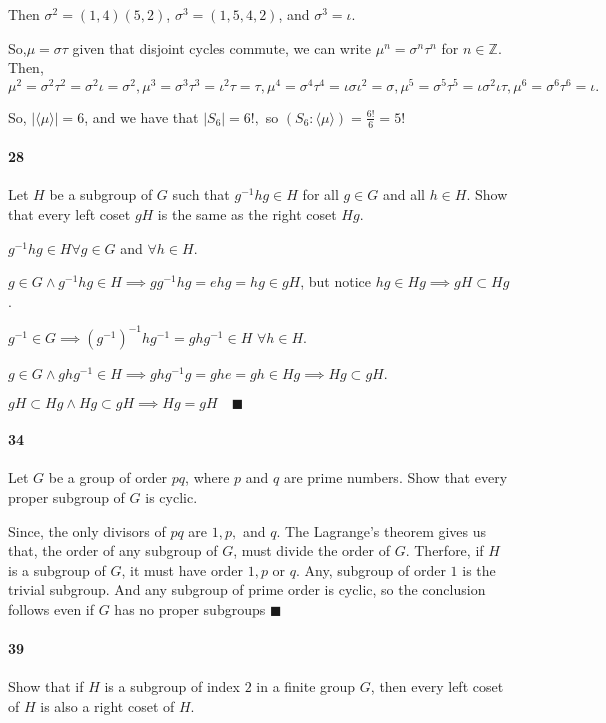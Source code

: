 \documentclass{article}
\newcommand\Z{\mathbb{Z}}
\begin{document}
Then $\sigma^2 = (1,4)(5,2)$, $\sigma^3 = (1,5,4,2)$, and $\sigma^3=\iota.$

So,$\mu = \sigma\tau$ given that disjoint cycles commute, we can write
$\mu^n = \sigma^n\tau^n$ for $n\in \Z$. Then, $$\mu^2 = \sigma^2\tau^2 = \sigma^2\iota =
\sigma^2, \mu^3 = \sigma^3\tau^3 = \iota^2\tau = \tau, \mu^4 =
\sigma^4\tau^4 = \iota\sigma\iota^2 = \sigma, \mu^5 = \sigma^5\tau^5
= \iota\sigma^2\iota\tau, \mu^6 = \sigma^6\tau^6 = \iota.$$

So, $|\langle  \mu\rangle| = 6$, and we have that $|S_6| = 6!,$ so
$(S_6:\langle \mu \rangle) = \frac{6!}{6} = 5!$


\paragraph{28} Let $H$ be a subgroup of $G$ such that $g^{-1}hg\in H$
for all $g \in G$ and  all $h\in H$. Show that every left coset $gH$
is the same as the right coset $Hg$.


$g^{-1}hg \in H \forall g\in G$ and $\forall h \in H$.

$g \in G \land g^{-1}hg\in H \implies gg^{-1}hg = ehg = hg \in gH$,
but notice $hg \in Hg \implies gH \subset Hg$.

$g^{-1}\in G \implies (g^{-1})^{-1}hg^{-1} = ghg^{-1}\in H$ $\forall h\in H$.

$g\in G \land ghg^{-1} \in H \implies ghg^{-1}g = ghe = gh\in Hg
\implies Hg \subset gH$.

$gH \subset Hg \land Hg \subset gH \implies Hg = gH \quad \blacksquare$

\paragraph{34} Let $G$ be a group of order $pq$, where $p$ and $q$ are
prime numbers. Show that every proper subgroup of $G$ is cyclic.


Since, the only divisors of $pq$ are $1,p,$ and $q$. The Lagrange's theorem
gives us that, the order of any subgroup of $G$, must divide the order
of $G$. Therfore, if $H$ is a subgroup of $G$, it must have order
$1,p$ or $q$. Any, subgroup of order $1$ is the trivial subgroup. And
any subgroup of prime order is cyclic, so the conclusion follows even
if $G$ has no proper subgroups $\blacksquare$

\newpage
\paragraph{39} Show that if $H$ is a subgroup of index $2$ in a finite
group $G$, then every left coset of $H$ is also a right coset of $H$.
\end{document}
